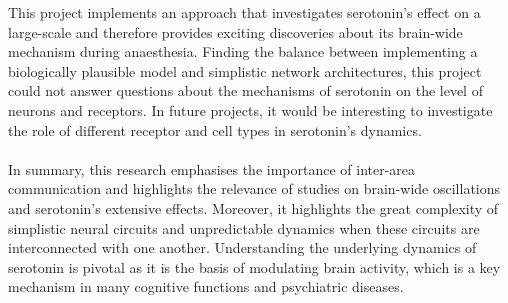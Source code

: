 \indent This project implements an approach that investigates serotonin's effect on a large-scale and therefore provides exciting discoveries about its brain-wide mechanism during anaesthesia. Finding the balance between implementing a biologically plausible model and simplistic network architectures, this project could not answer questions about the mechanisms of serotonin on the level of neurons and receptors.  In future projects, it would be interesting to investigate the role of different receptor and cell types in serotonin’s dynamics. 
\\
\\
\indent In summary, this research emphasises the importance of inter-area communication and highlights the relevance of studies on brain-wide oscillations and serotonin's extensive effects. Moreover, it highlights the great complexity of simplistic neural circuits and unpredictable dynamics when these circuits are interconnected with one another. Understanding the underlying dynamics of serotonin is pivotal as it is the basis of modulating brain activity, which is a key mechanism in many cognitive functions and psychiatric diseases.  

